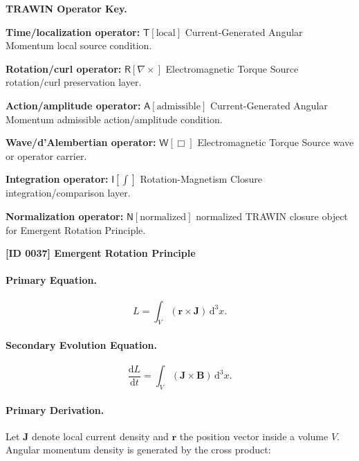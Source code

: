 \par\vspace{0.45\baselineskip}
\noindent\begin{minipage}[t]{\linewidth}
\begingroup
\small
\raggedright
\textbf{TRAWIN Operator Key.}\par
\noindent\textbf{Time/localization operator:} $\mathsf{T}\!\left[\mathrm{local}\right]$ Current-Generated Angular Momentum local source condition.\par
\noindent\textbf{Rotation/curl operator:} $\mathsf{R}\!\left[\nabla\times\right]$ Electromagnetic Torque Source rotation/curl preservation layer.\par
\noindent\textbf{Action/amplitude operator:} $\mathsf{A}\!\left[\mathrm{admissible}\right]$ Current-Generated Angular Momentum admissible action/amplitude condition.\par
\noindent\textbf{Wave/d'Alembertian operator:} $\mathsf{W}\!\left[\Box\right]$ Electromagnetic Torque Source wave or operator carrier.\par
\noindent\textbf{Integration operator:} $\mathsf{I}\!\left[\int\right]$ Rotation-Magnetism Closure integration/comparison layer.\par
\noindent\textbf{Normalization operator:} $\mathsf{N}\!\left[\mathrm{normalized}\right]$ normalized TRAWIN closure object for Emergent Rotation Principle.\par
\endgroup
\end{minipage}

\clearpage
\noindent\textbf{[ID 0037] Emergent Rotation Principle}\par
\vspace{0.35em}
\paragraph{Primary Equation.}
\begin{equation}
L
=
\int_V
(\mathbf{r}\times\mathbf{J})
\,\mathrm{d}^3x .
\end{equation}

\paragraph{Secondary Evolution Equation.}
\begin{equation}
\frac{\mathrm{d}L}{\mathrm{d}t}
=
\int_V
(\mathbf{J}\times\mathbf{B})
\,\mathrm{d}^3x .
\end{equation}

\paragraph{Primary Derivation.}
Let $\mathbf{J}$ denote local current density and $\mathbf{r}$ the position vector inside a volume $V$.  
Angular momentum density is generated by the cross product:

